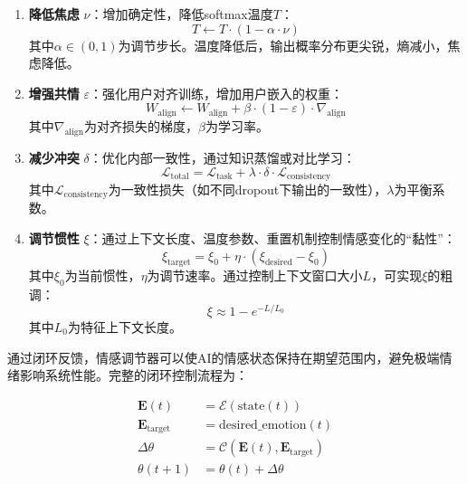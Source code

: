 \documentclass[12pt,a4paper]{article}
\theoremstyle{plain}
\newcommand{\ve}[1]{\bm{#1}}                    %
\newcommand{\Evec}{\ve{E}}                        %
\begin{document}
\begin{enumerate}
    \item \textbf{降低焦虑} $\nu$：增加确定性，降低softmax温度$T$：
    \begin{equation}
    T \leftarrow T \cdot (1 - \alpha \cdot \nu)
    \label{eq:adjust_nu}
    \end{equation}
    其中$\alpha \in (0,1)$为调节步长。温度降低后，输出概率分布更尖锐，熵减小，焦虑降低。
    
    \item \textbf{增强共情} $\varepsilon$：强化用户对齐训练，增加用户嵌入的权重：
    \begin{equation}
    W_{\text{align}} \leftarrow W_{\text{align}} + \beta \cdot (1 - \varepsilon) \cdot \nabla_{\text{align}}
    \label{eq:adjust_eps}
    \end{equation}
    其中$\nabla_{\text{align}}$为对齐损失的梯度，$\beta$为学习率。
    
    \item \textbf{减少冲突} $\delta$：优化内部一致性，通过知识蒸馏或对比学习：
    \begin{equation}
    \mathcal{L}_{\text{total}} = \mathcal{L}_{\text{task}} + \lambda \cdot \delta \cdot \mathcal{L}_{\text{consistency}}
    \label{eq:adjust_delta}
    \end{equation}
    其中$\mathcal{L}_{\text{consistency}}$为一致性损失（如不同dropout下输出的一致性），$\lambda$为平衡系数。
    
    \item \textbf{调节惯性} $\xi$：通过上下文长度、温度参数、重置机制控制情感变化的“黏性”：
    \begin{equation}
    \xi_{\text{target}} = \xi_0 + \eta \cdot (\xi_{\text{desired}} - \xi_0)
    \label{eq:adjust_xi}
    \end{equation}
    其中$\xi_0$为当前惯性，$\eta$为调节速率。通过控制上下文窗口大小$L$，可实现$\xi$的粗调：
    \begin{equation}
    \xi \approx 1 - e^{-L/L_0}
    \label{eq:xi_context}
    \end{equation}
    其中$L_0$为特征上下文长度。
\end{enumerate}

通过闭环反馈，情感调节器可以使AI的情感状态保持在期望范围内，避免极端情绪影响系统性能。完整的闭环控制流程为：

\begin{equation}
\begin{aligned}
\Evec(t) &= \mathcal{E}(\text{state}(t)) \\
\Evec_{\text{target}} &= \text{desired\_emotion}(t) \\
\Delta \theta &= \mathcal{C}(\Evec(t), \Evec_{\text{target}}) \\
\theta(t+1) &= \theta(t) + \Delta \theta
\end{aligned}
\label{eq:closed_loop}
\end{equation}
\end{document}

